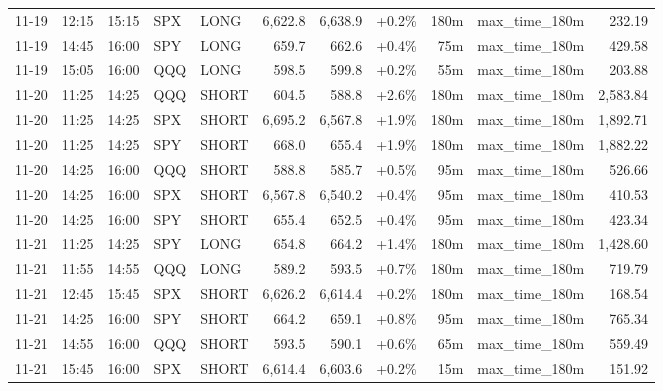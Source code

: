 \documentclass[11pt,a4paper,twoside]{article}
\begin{document}
\begin{center}
\begin{longtable}{>{\color{txtmain}}l l l l l r r r r >{\color{txtmain}}l r}
11-19 & 12:15 & 15:15 & SPX & LONG & 6,622.8 & 6,638.9 & \textcolor{wingreen}{+0.2\%} & 180m & max\_time\_180m & \textcolor{wingreen}{232.19} \\
11-19 & 14:45 & 16:00 & SPY & LONG & 659.7 & 662.6 & \textcolor{wingreen}{+0.4\%} & 75m & max\_time\_180m & \textcolor{wingreen}{429.58} \\
11-19 & 15:05 & 16:00 & QQQ & LONG & 598.5 & 599.8 & \textcolor{wingreen}{+0.2\%} & 55m & max\_time\_180m & \textcolor{wingreen}{203.88} \\
11-20 & 11:25 & 14:25 & QQQ & SHORT & 604.5 & 588.8 & \textcolor{wingreen}{+2.6\%} & 180m & max\_time\_180m & \textcolor{wingreen}{2,583.84} \\
11-20 & 11:25 & 14:25 & SPX & SHORT & 6,695.2 & 6,567.8 & \textcolor{wingreen}{+1.9\%} & 180m & max\_time\_180m & \textcolor{wingreen}{1,892.71} \\
11-20 & 11:25 & 14:25 & SPY & SHORT & 668.0 & 655.4 & \textcolor{wingreen}{+1.9\%} & 180m & max\_time\_180m & \textcolor{wingreen}{1,882.22} \\
11-20 & 14:25 & 16:00 & QQQ & SHORT & 588.8 & 585.7 & \textcolor{wingreen}{+0.5\%} & 95m & max\_time\_180m & \textcolor{wingreen}{526.66} \\
11-20 & 14:25 & 16:00 & SPX & SHORT & 6,567.8 & 6,540.2 & \textcolor{wingreen}{+0.4\%} & 95m & max\_time\_180m & \textcolor{wingreen}{410.53} \\
11-20 & 14:25 & 16:00 & SPY & SHORT & 655.4 & 652.5 & \textcolor{wingreen}{+0.4\%} & 95m & max\_time\_180m & \textcolor{wingreen}{423.34} \\
11-21 & 11:25 & 14:25 & SPY & LONG & 654.8 & 664.2 & \textcolor{wingreen}{+1.4\%} & 180m & max\_time\_180m & \textcolor{wingreen}{1,428.60} \\
11-21 & 11:55 & 14:55 & QQQ & LONG & 589.2 & 593.5 & \textcolor{wingreen}{+0.7\%} & 180m & max\_time\_180m & \textcolor{wingreen}{719.79} \\
11-21 & 12:45 & 15:45 & SPX & SHORT & 6,626.2 & 6,614.4 & \textcolor{wingreen}{+0.2\%} & 180m & max\_time\_180m & \textcolor{wingreen}{168.54} \\
11-21 & 14:25 & 16:00 & SPY & SHORT & 664.2 & 659.1 & \textcolor{wingreen}{+0.8\%} & 95m & max\_time\_180m & \textcolor{wingreen}{765.34} \\
11-21 & 14:55 & 16:00 & QQQ & SHORT & 593.5 & 590.1 & \textcolor{wingreen}{+0.6\%} & 65m & max\_time\_180m & \textcolor{wingreen}{559.49} \\
11-21 & 15:45 & 16:00 & SPX & SHORT & 6,614.4 & 6,603.6 & \textcolor{wingreen}{+0.2\%} & 15m & max\_time\_180m & \textcolor{wingreen}{151.92} \\

\end{longtable}
\end{center}
\end{document}
